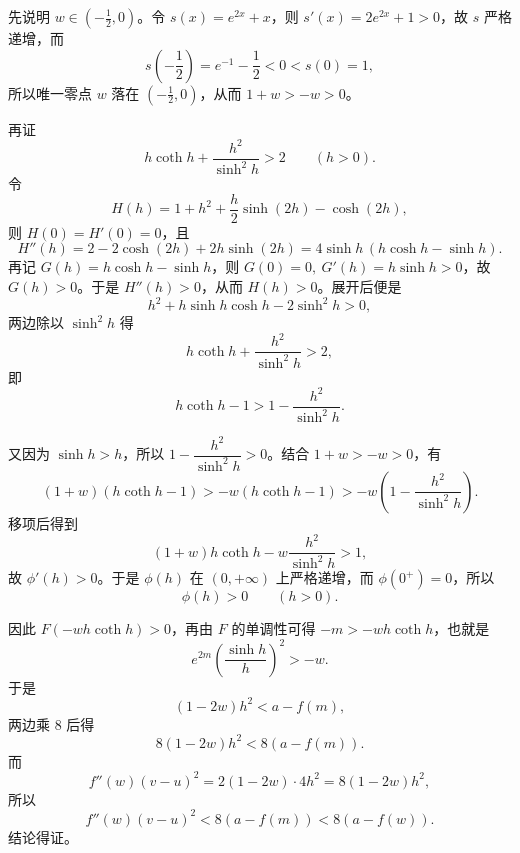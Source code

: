 \begin{solution}
先说明 $w\in\left(-\frac12,0\right)$。令 $s(x)=e^{2x}+x$，则 $s'(x)=2e^{2x}+1>0$，故 $s$ 严格递增，而
$$ s\left(-\frac12\right)=e^{-1}-\frac12<0<s(0)=1, $$
所以唯一零点 $w$ 落在 $\left(-\frac12,0\right)$，从而 $1+w>-w>0$。

再证
$$ h\coth h+\frac{h^2}{\sinh^2 h}>2 \qquad (h>0). $$
令
$$ H(h)=1+h^2+\frac{h}{2}\sinh(2h)-\cosh(2h), $$
则 $H(0)=H'(0)=0$，且
$$ H''(h)=2-2\cosh(2h)+2h\sinh(2h)=4\sinh h\,(h\cosh h-\sinh h). $$
再记 $G(h)=h\cosh h-\sinh h$，则 $G(0)=0,\ G'(h)=h\sinh h>0$，故 $G(h)>0$。于是 $H''(h)>0$，从而 $H(h)>0$。展开后便是
$$ h^2+h\sinh h\cosh h-2\sinh^2 h>0, $$
两边除以 $\sinh^2 h$ 得
$$ h\coth h+\frac{h^2}{\sinh^2 h}>2, $$
即
$$ h\coth h-1>1-\frac{h^2}{\sinh^2 h}. $$

又因为 $\sinh h>h$，所以 $1-\dfrac{h^2}{\sinh^2 h}>0$。结合 $1+w>-w>0$，有
$$ (1+w)(h\coth h-1)>-w(h\coth h-1)>-w\left(1-\frac{h^2}{\sinh^2 h}\right). $$
移项后得到
$$ (1+w)h\coth h-w\frac{h^2}{\sinh^2 h}>1, $$
故 $\phi'(h)>0$。于是 $\phi(h)$ 在 $(0,+\infty)$ 上严格递增，而 $\phi(0^+)=0$，所以
$$ \phi(h)>0 \qquad (h>0). $$

因此 $F(-wh\coth h)>0$，再由 $F$ 的单调性可得 $-m>-wh\coth h$，也就是
$$ e^{2m}\left(\frac{\sinh h}{h}\right)^2>-w. $$
于是
$$ (1-2w)h^2<a-f(m), $$
两边乘 $8$ 后得
$$ 8(1-2w)h^2<8(a-f(m)). $$
而
$$ f''(w)(v-u)^2=2(1-2w)\cdot4h^2=8(1-2w)h^2, $$
所以
$$ f''(w)(v-u)^2<8(a-f(m))<8(a-f(w)). $$
结论得证。
\end{solution}

